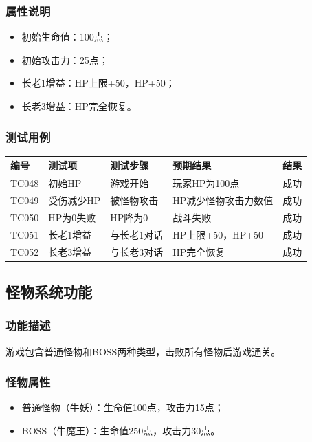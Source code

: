 \documentclass[a4paper,12pt]{article}
\begin{document}
\subsubsection{属性说明}
\begin{itemize}[leftmargin=2em]
    \item 初始生命值：100点；
    \item 初始攻击力：25点；
    \item 长老1增益：HP上限+50，HP+50；
    \item 长老3增益：HP完全恢复。
\end{itemize}

\subsubsection{测试用例}
\begin{longtable}{p{1.2cm} p{2.8cm} p{4cm} p{3.5cm} p{1.5cm}}
\toprule
\textbf{编号} & \textbf{测试项} & \textbf{测试步骤} & \textbf{预期结果} & \textbf{结果} \\
\midrule
\endhead
TC048 & 初始HP & 游戏开始 & 玩家HP为100点 & 成功 \\
TC049 & 受伤减少HP & 被怪物攻击 & HP减少怪物攻击力数值 & 成功 \\
TC050 & HP为0失败 & HP降为0 & 战斗失败 & 成功 \\
TC051 & 长老1增益 & 与长老1对话 & HP上限+50，HP+50 & 成功 \\
TC052 & 长老3增益 & 与长老3对话 & HP完全恢复 & 成功 \\
\bottomrule
\end{longtable}

\subsection{怪物系统功能}

\subsubsection{功能描述}
游戏包含普通怪物和BOSS两种类型，击败所有怪物后游戏通关。

\subsubsection{怪物属性}
\begin{itemize}[leftmargin=2em]
    \item 普通怪物（牛妖）：生命值100点，攻击力15点；
    \item BOSS（牛魔王）：生命值250点，攻击力30点。
\end{itemize}
\end{document}
